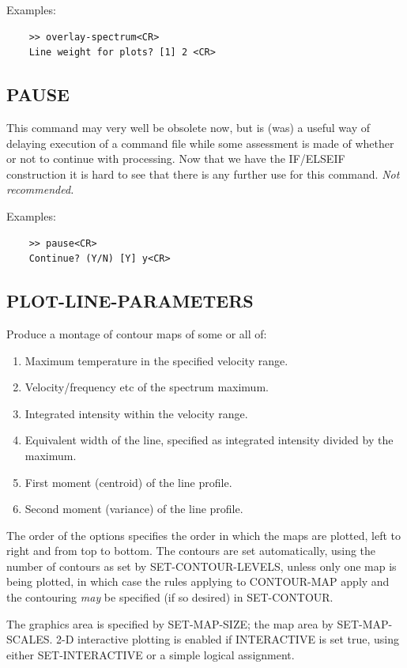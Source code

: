 \documentclass[11pt,twoside]{report}
\begin{document}
Examples:
\begin{verbatim}
    >> overlay-spectrum<CR>
    Line weight for plots? [1] 2 <CR>
\end{verbatim}

\subsection{PAUSE} 

This command may very well be obsolete now, but is (was) a useful way of
delaying execution of a command file while some assessment is made of
whether or not to continue with processing. Now that we have the IF/ELSEIF
construction it is hard to see that there is any further use for this
command. {\em Not recommended.}

Examples:
\begin{verbatim}
    >> pause<CR>
    Continue? (Y/N) [Y] y<CR>
\end{verbatim}

\subsection{PLOT-LINE-PARAMETERS} 

Produce a montage of contour maps of some or all of:
\begin{enumerate}
\item Maximum temperature in the specified velocity range.
\item Velocity/frequency etc of the spectrum maximum.
\item Integrated intensity within the velocity range.
\item Equivalent width of the line, specified as integrated intensity
      divided by the maximum.
\item First moment (centroid) of the line profile.
\item Second moment (variance) of the line
      profile.
\end{enumerate}
The order of the options specifies the order in which the maps are plotted,
left to right and from top to bottom. The contours are set automatically,
using the number of contours as set by SET-CONTOUR-LEVELS, unless only one
map is being plotted, in which case the rules applying to CONTOUR-MAP apply
and the contouring {\em may} be specified (if so desired) in SET-CONTOUR.

The graphics area is specified by SET-MAP-SIZE; the map area by
SET-MAP-SCALES. 2-D interactive plotting is enabled if INTERACTIVE is set
true, using either SET-INTERACTIVE or a simple logical assignment.
\end{document}
